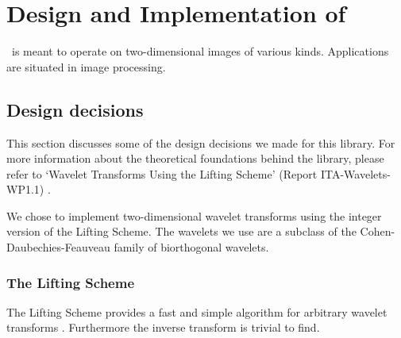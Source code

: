 %
%
% 
% 
% 
% 
%

\section{Design and Implementation of \libname}

\libname\ is meant to operate on two-dimensional images of various kinds.
Applications are situated in image processing.


\subsection{Design decisions}

This section discusses some of the design decisions we made for this library.
For more information about the theoretical foundations behind the library,
please refer to `Wavelet Transforms Using the Lifting Scheme' (Report
ITA-Wavelets-WP1.1) \cite{ITA-Wavelets-WP1.1,UytVWuJanRooBul98}.

We chose to implement two-dimensional wavelet transforms using the integer
version of the Lifting Scheme. The wavelets we use are a subclass of the
Cohen-Daubechies-Feauveau family of biorthogonal wavelets.

\subsubsection{The Lifting Scheme}

The Lifting Scheme \cite{swe:lift1,swe:lift2,swe:spie95} provides a fast and
simple algorithm for arbitrary wavelet transforms \cite{ds:factor}. Furthermore
the inverse transform is trivial to find.

